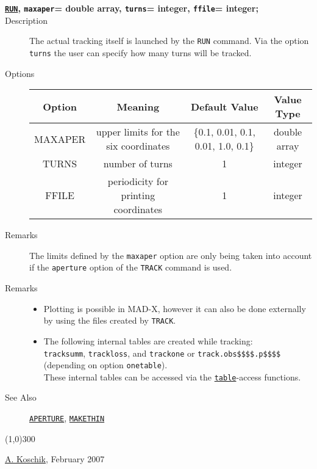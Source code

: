 \begin{description}
	\item[\textbf{\texttt{\href{run}{RUN}}, \texttt{maxaper}= double array, \texttt{turns}= integer, \texttt{ffile}= integer;}] 

	\item[Description] 
             The actual tracking itself is launched by the \texttt{RUN} command. Via the option 
             \texttt{turns} the user can specify how many turns will be tracked.
           
	\item[Options] 
		\text{ \\}	
	
\begin{tabular}{cccc}
\hline 
\textbf{Option} & \textbf{Meaning} & \textbf{Default Value} & \textbf{Value Type} \\ 
\hline
MAXAPER & upper limits for the six coordinates & \{0.1, 0.01, 0.1, 0.01, 1.0, 0.1\} & double array \\ 
\hline
TURNS & number of turns  & 1 & integer \\ 
\hline
FFILE & periodicity for printing coordinates  & 1 & integer \\ 
\hline

\end{tabular}
	\item[Remarks] 
          The limits defined by the \texttt{maxaper} option are only being taken into account if the 
          \texttt{aperture} option of the \texttt{TRACK} command is used.
           
\end{description}
% 
% 

\begin{description}
	\item[Remarks] 
\begin{itemize}
	\item Plotting is possible in MAD-X, however it can also be done
             externally by using the files created by \texttt{TRACK}. 
	\item The following internal tables are created while tracking:
\\
\texttt{tracksumm}, 
\texttt{trackloss}, and 
\texttt{trackone} or 
\texttt{track.obs\$\$\$\$.p\$\$\$\$} 
         (depending on option \texttt{onetable}).
\\
         These internal tables can be accessed via the 
         \href{../Introduction/expression.html#table}{\texttt{table}}-access functions.
          
\end{itemize}

	\item[See Also] \href{../Introduction/aperture.html}{\texttt{APERTURE}}, 
       \href{../makethin/makethin.html}{\texttt{MAKETHIN}}
\end{description}

\line(1,0){300}

\href{http://consult.cern.ch/xwho/people/74251}{A. Koschik}, 
 February  2007
 

